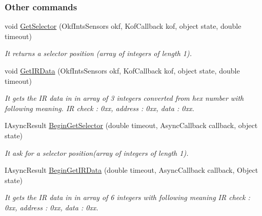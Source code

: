 \subsubsection*{Other commands} %
\label{ssub:Extra}
  \begin{DoxyCompactItemize}

  \item  void \hyperlink{class_elib_1_1_epuck_a40c8bc92b67a20c3fdf891997eaf03c5}{GetSelector} (OkfIntsSensors okf, KofCallback kof, object state, double timeout)
  \begin{DoxyCompactList}\small\item\em It returns a selector position (array of integers of length 1). \item\end{DoxyCompactList}

  \item   void \hyperlink{class_elib_1_1_epuck_ad74c7a6d5618da33d84aee5666d990c5}{GetIRData} (OkfIntsSensors okf, KofCallback kof, object state, double timeout)
  \begin{DoxyCompactList}\small\item\em It gets the IR data in in array of 3 integers converted from hex number with following meaning. IR check : 0xx, address : 0xx, data : 0xx. \item\end{DoxyCompactList}

  \item   IAsyncResult \hyperlink{class_elib_1_1_epuck_a23a675feab78848b194cb49a01a30463}{BeginGetSelector} (double timeout, AsyncCallback callback, object state)
  \begin{DoxyCompactList}\small\item\em It ask for a selector position(array of integers of length 1). \item\end{DoxyCompactList}

  \item IAsyncResult \hyperlink{class_elib_1_1_epuck_a58eb06f216af8ff7a7203f0f91b010e7}{BeginGetIRData} (double timeout, AsyncCallback callback, Object state)
  \begin{DoxyCompactList}\small\item\em It gets the IR data in in array of 6 integers with following meaning IR check : 0xx, address : 0xx, data : 0xx. \item\end{DoxyCompactList}

  \end{DoxyCompactItemize}

